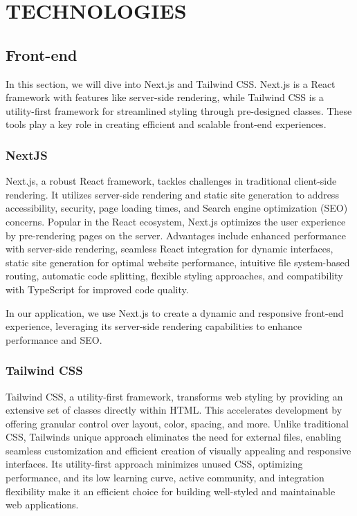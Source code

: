 \chapter{TECHNOLOGIES}

\section{Front-end}


In this section, we will dive into Next.js and Tailwind CSS. Next.js is
a React framework with features like server-side rendering, while
Tailwind CSS is a utility-first framework for streamlined styling
through pre-designed classes. These tools play a key role in creating
efficient and scalable front-end experiences.


\subsection{NextJS}

Next.js, a robust React framework, tackles challenges in traditional
client-side rendering. It utilizes server-side rendering and static site
generation to address accessibility, security, page loading times, and
Search engine optimization (SEO) concerns. Popular in the React
ecosystem, Next.js optimizes the user experience by pre-rendering pages
on the server. Advantages include enhanced performance with server-side
rendering, seamless React integration for dynamic interfaces, static
site generation for optimal website performance, intuitive file
system-based routing, automatic code splitting, flexible styling
approaches, and compatibility with TypeScript for improved code quality.

In our application, we use Next.js to create a dynamic and responsive
front-end experience, leveraging its server-side rendering capabilities
to enhance performance and SEO.

\subsection{Tailwind CSS}

Tailwind CSS, a utility-first framework, transforms web styling by
providing an extensive set of classes directly within HTML. This
accelerates development by offering granular control over layout, color,
spacing, and more. Unlike traditional CSS, Tailwind\textquotesingle s
unique approach eliminates the need for external files, enabling
seamless customization and efficient creation of visually appealing and
responsive interfaces. Its utility-first approach minimizes unused CSS,
optimizing performance, and its low learning curve, active community,
and integration flexibility make it an efficient choice for building
well-styled and maintainable web applications.

